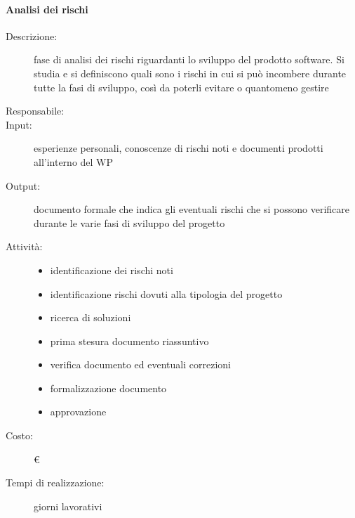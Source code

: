\paragraph{Analisi dei rischi}
\begin{description}
\item[Descrizione:] fase di analisi dei rischi riguardanti lo sviluppo del prodotto software. Si
studia e si definiscono quali sono i rischi in cui si può incombere durante tutte la fasi di
sviluppo, così da poterli evitare o quantomeno gestire

\item[Responsabile:] 

\item[Input:] esperienze personali, conoscenze di rischi noti e documenti prodotti all’interno
del WP

\item[Output:] documento formale che indica gli eventuali rischi che si possono verificare
durante le varie fasi di sviluppo del progetto

\item[Attività:]
\begin{itemize}
\item identificazione dei rischi noti
\item identificazione rischi dovuti alla tipologia del progetto
\item ricerca di soluzioni
\item prima stesura documento riassuntivo
\item verifica documento ed eventuali correzioni
\item formalizzazione documento
\item approvazione
\end{itemize}
\item[Costo:] \euro 
\item[Tempi di realizzazione:]  giorni lavorativi
\end{description}


